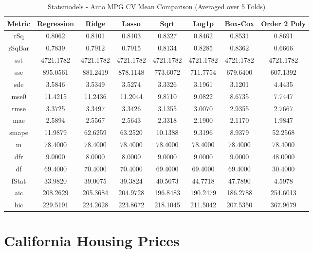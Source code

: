 \documentclass{article}
\begin{document}
\begin{table}[H]
\centering
\caption{Statsmodels - Auto MPG CV Mean Comparison (Averaged over 5 Folds)}
\label{tab:Statsmodels - Auto MPG CV Mean Comparison}
\begin{tabular}{|c|c|c|c|c|c|c|c|}\hline
Metric & Regression & Ridge & Lasso & Sqrt & Log1p & Box-Cox & Order 2 Poly \\\hline \hline
rSq & 0.8062 & 0.8101 & 0.8103 & 0.8327 & 0.8462 & 0.8531 & 0.8691 \\\hline
rSqBar & 0.7839 & 0.7912 & 0.7915 & 0.8134 & 0.8285 & 0.8362 & 0.6666 \\\hline
sst & 4721.1782 & 4721.1782 & 4721.1782 & 4721.1782 & 4721.1782 & 4721.1782 & 4721.1782 \\\hline
sse & 895.0561 & 881.2419 & 878.1148 & 773.6072 & 711.7754 & 679.6400 & 607.1392 \\\hline
sde & 3.5846 & 3.5349 & 3.5274 & 3.3326 & 3.1961 & 3.1201 & 4.4435 \\\hline
mse0 & 11.4215 & 11.2436 & 11.2044 & 9.8710 & 9.0822 & 8.6735 & 7.7447 \\\hline
rmse & 3.3725 & 3.3497 & 3.3426 & 3.1355 & 3.0070 & 2.9355 & 2.7667 \\\hline
mae & 2.5894 & 2.5567 & 2.5643 & 2.3318 & 2.1900 & 2.1170 & 1.9847 \\\hline
smape & 11.9879 & 62.6259 & 63.2520 & 10.1388 & 9.3196 & 8.9379 & 52.2568 \\\hline
m & 78.4000 & 78.4000 & 78.4000 & 78.4000 & 78.4000 & 78.4000 & 78.4000 \\\hline
dfr & 9.0000 & 8.0000 & 8.0000 & 9.0000 & 9.0000 & 9.0000 & 48.0000 \\\hline
df & 69.4000 & 70.4000 & 70.4000 & 69.4000 & 69.4000 & 69.4000 & 30.4000 \\\hline
fStat & 33.9820 & 39.0075 & 39.3824 & 40.5073 & 44.7718 & 47.7890 & 4.5978 \\\hline
aic & 208.2629 & 205.3684 & 204.9728 & 196.8483 & 190.2479 & 186.2788 & 254.6013 \\\hline
bic & 229.5191 & 224.2628 & 223.8672 & 218.1045 & 211.5042 & 207.5350 & 367.9679 \\\hline
\end{tabular}
\end{table}

\section{California Housing Prices}\label{House Prices}
\end{document}
